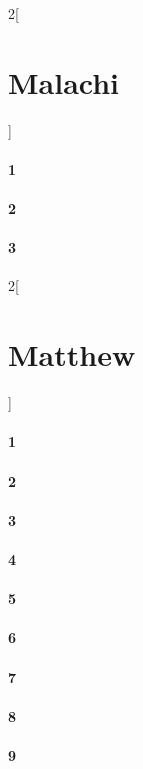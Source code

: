 \documentclass{book}
\begin{document}
\begin{multicols}{2}[\part{Malachi}]
\subsection*{1}
\subsection*{2}
\subsection*{3}
\end{multicols}
\begin{multicols}{2}[\part{Matthew}]
\subsection*{1}
\subsection*{2}
\subsection*{3}
\subsection*{4}
\subsection*{5}
\subsection*{6}
\subsection*{7}
\subsection*{8}
\subsection*{9}

\end{multicols}
\end{document}
